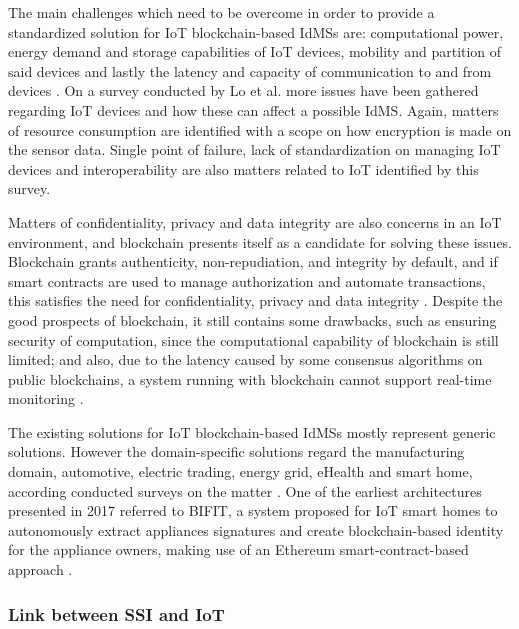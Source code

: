 The main challenges which need to be overcome in order to provide a standardized solution for IoT blockchain-based IdMSs are: computational power, energy demand and storage capabilities of IoT devices, mobility and partition of said devices and lastly the latency and capacity of communication to and from devices \cite{inbookWang}. On a survey conducted by Lo et al. \cite{lo2019analysis} more issues have been gathered regarding IoT devices and how these can affect a possible IdMS. Again, matters of resource consumption are identified with a scope on how encryption is made on the sensor data. Single point of failure, lack of standardization on managing IoT devices and interoperability are also matters related to IoT identified by this survey.

Matters of confidentiality, privacy and data integrity are also concerns in an IoT environment, and blockchain presents itself as a candidate for solving these issues. Blockchain grants authenticity, non-repudiation, and integrity by default, and if smart contracts are used to manage authorization and automate transactions, this satisfies the need for confidentiality, privacy and data integrity \cite{s18082575}. Despite the good prospects of blockchain, it still contains some drawbacks, such as ensuring security of computation, since the computational capability of blockchain is still limited; and also, due to the latency caused by some consensus algorithms on public blockchains, a system running with blockchain cannot support real-time monitoring \cite{lo2019analysis}.

The existing solutions for IoT blockchain-based IdMSs mostly represent generic solutions. However the domain-specific solutions regard the manufacturing domain, automotive, electric trading, energy grid, eHealth and smart home, according conducted surveys on the matter \cite{lo2019analysis}. One of the earliest architectures presented in 2017 referred to BIFIT, a system proposed for IoT smart homes to autonomously extract appliances signatures and create blockchain-based identity for the appliance owners, making use of an Ethereum smart-contract-based approach \cite{zhu2017autonomic}.

\subsubsection{Link between SSI and IoT}
\label{subsubsec:link_between_ssi_and_IoTIoV}

